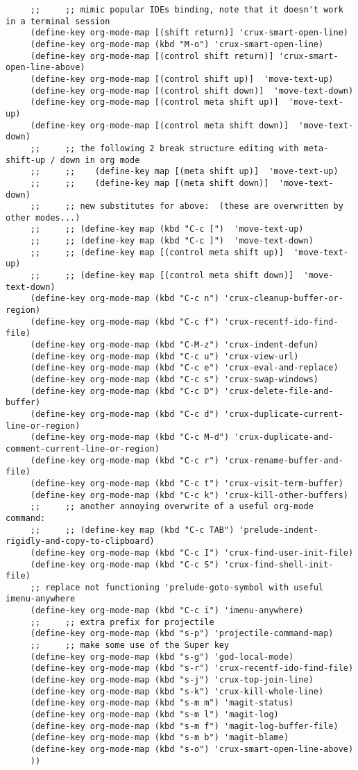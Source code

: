 \documentclass[11pt]{article}
\begin{document}
\begin{verbatim}
     ;;     ;; mimic popular IDEs binding, note that it doesn't work in a terminal session
     (define-key org-mode-map [(shift return)] 'crux-smart-open-line)
     (define-key org-mode-map (kbd "M-o") 'crux-smart-open-line)
     (define-key org-mode-map [(control shift return)] 'crux-smart-open-line-above)
     (define-key org-mode-map [(control shift up)]  'move-text-up)
     (define-key org-mode-map [(control shift down)]  'move-text-down)
     (define-key org-mode-map [(control meta shift up)]  'move-text-up)
     (define-key org-mode-map [(control meta shift down)]  'move-text-down)
     ;;     ;; the following 2 break structure editing with meta-shift-up / down in org mode
     ;;     ;;    (define-key map [(meta shift up)]  'move-text-up)
     ;;     ;;    (define-key map [(meta shift down)]  'move-text-down)
     ;;     ;; new substitutes for above:  (these are overwritten by other modes...)
     ;;     ;; (define-key map (kbd "C-c [")  'move-text-up)
     ;;     ;; (define-key map (kbd "C-c ]")  'move-text-down)
     ;;     ;; (define-key map [(control meta shift up)]  'move-text-up)
     ;;     ;; (define-key map [(control meta shift down)]  'move-text-down)
     (define-key org-mode-map (kbd "C-c n") 'crux-cleanup-buffer-or-region)
     (define-key org-mode-map (kbd "C-c f") 'crux-recentf-ido-find-file)
     (define-key org-mode-map (kbd "C-M-z") 'crux-indent-defun)
     (define-key org-mode-map (kbd "C-c u") 'crux-view-url)
     (define-key org-mode-map (kbd "C-c e") 'crux-eval-and-replace)
     (define-key org-mode-map (kbd "C-c s") 'crux-swap-windows)
     (define-key org-mode-map (kbd "C-c D") 'crux-delete-file-and-buffer)
     (define-key org-mode-map (kbd "C-c d") 'crux-duplicate-current-line-or-region)
     (define-key org-mode-map (kbd "C-c M-d") 'crux-duplicate-and-comment-current-line-or-region)
     (define-key org-mode-map (kbd "C-c r") 'crux-rename-buffer-and-file)
     (define-key org-mode-map (kbd "C-c t") 'crux-visit-term-buffer)
     (define-key org-mode-map (kbd "C-c k") 'crux-kill-other-buffers)
     ;;     ;; another annoying overwrite of a useful org-mode command:
     ;;     ;; (define-key map (kbd "C-c TAB") 'prelude-indent-rigidly-and-copy-to-clipboard)
     (define-key org-mode-map (kbd "C-c I") 'crux-find-user-init-file)
     (define-key org-mode-map (kbd "C-c S") 'crux-find-shell-init-file)
     ;; replace not functioning 'prelude-goto-symbol with useful imenu-anywhere
     (define-key org-mode-map (kbd "C-c i") 'imenu-anywhere)
     ;;     ;; extra prefix for projectile
     (define-key org-mode-map (kbd "s-p") 'projectile-command-map)
     ;;     ;; make some use of the Super key
     (define-key org-mode-map (kbd "s-g") 'god-local-mode)
     (define-key org-mode-map (kbd "s-r") 'crux-recentf-ido-find-file)
     (define-key org-mode-map (kbd "s-j") 'crux-top-join-line)
     (define-key org-mode-map (kbd "s-k") 'crux-kill-whole-line)
     (define-key org-mode-map (kbd "s-m m") 'magit-status)
     (define-key org-mode-map (kbd "s-m l") 'magit-log)
     (define-key org-mode-map (kbd "s-m f") 'magit-log-buffer-file)
     (define-key org-mode-map (kbd "s-m b") 'magit-blame)
     (define-key org-mode-map (kbd "s-o") 'crux-smart-open-line-above)
     ))


\end{verbatim}
\end{document}
